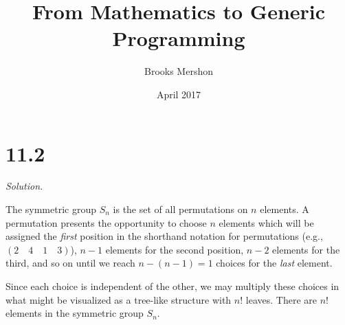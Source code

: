 \documentclass{article}
\title{From Mathematics to Generic Programming}
\author{Brooks Mershon}
\date{April 2017}
\begin{document}
\maketitle

\section*{11.2}

\textit{Solution.}

The symmetric group $S_n$ is the set of all permutations on $n$ elements. A permutation presents the opportunity to choose $n$ elements which will be assigned the \textit{first} position in the shorthand notation for permutations (e.g., $(2 \quad 4 \quad 1 \quad 3)$), $n - 1$ elements for the second position, $n - 2$ elements for the third, and so on until we reach $n - (n - 1) = 1$ choices for the \textit{last} element.

Since each choice is independent of the other, we may multiply these choices in what might be visualized as a tree-like structure with $n!$ leaves. There are $n!$ elements in the symmetric group $S_n$.
\end{document}
